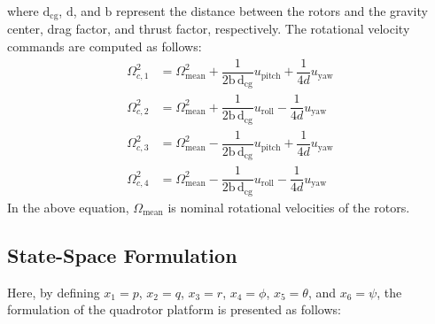 \documentclass[3p,times]{elsarticle}
\begin{document}
where $\mathrm{d}_{\text{cg}}$, $\text{d}$, and $\text{b}$ represent the distance between the rotors and the gravity center, drag factor, and thrust factor, respectively. The rotational velocity commands are computed as follows:
\begin{align}
		\Omega_{c, 1}^2 &= \Omega_{\text{mean}}^2 + \dfrac{1}{2\mathrm{b\,d}_{\text{cg}}}u_{\text{pitch}} + \dfrac{1}{4d}u_{\text{yaw}} \\
	\Omega_{c, 2}^2 &= \Omega_{\text{mean}}^2 + \dfrac{1}{2\mathrm{b\,d}_{\text{cg}}}u_{\text{roll}} - \dfrac{1}{4d}u_{\text{yaw}}\\
	\Omega_{c, 3}^2 &= \Omega_{\text{mean}}^2 - \dfrac{1}{2\mathrm{b\,d}_{\text{cg}}}u_{\text{pitch}} + \dfrac{1}{4d}u_{\text{yaw}} \\
\Omega_{c, 4}^2 &= \Omega_{\text{mean}}^2 - \dfrac{1}{2\mathrm{b\,d}_{\text{cg}}}u_{\text{roll}} - \dfrac{1}{4d}u_{\text{yaw}}
\end{align}
In the above equation, $\Omega_{\text{mean}}$ is nominal rotational velocities of the rotors.
\subsection{State-Space Formulation}\label{sec:state-space}
\noindent Here, by defining $x_1 = p$, $x_2 = q$, $x_3 = r$, $x_4 = \phi$, $x_5 = \theta$, and $x_6 = \psi$, the formulation of the quadrotor platform is presented as follows:
\end{document}
